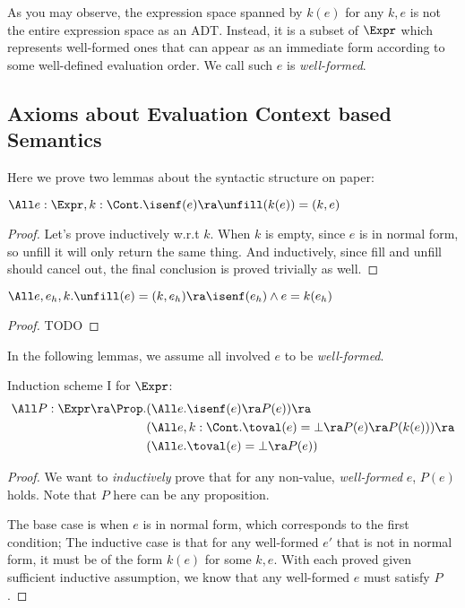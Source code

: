 As you may observe, the expression space spanned by $k(e)$ for any $k, e$ is not the entire
expression space as an ADT. Instead, it is a subset of $\Expr$ which represents well-formed ones
that can appear as an immediate form according to some well-defined evaluation order. We call
such $e$ is \emph{well-formed}.

\subsection{Axioms about Evaluation Context based Semantics}

Here we prove two lemmas about the syntactic structure on paper:

\begin{lemma}
$\All e: \Expr, k: \Cont . \isenf(e) \ra \unfill(k(e)) = (k, e)$
\end{lemma}
\begin{proof}

Let's prove inductively w.r.t $k$. When $k$ is empty,
since $e$ is in normal form, so unfill it will only return the same thing.
And inductively, since fill and unfill should cancel out, the final conclusion is proved trivially as well.

\end{proof}

\begin{lemma}
  $\All e, e_h, k. \unfill(e) = (k, e_h) \ra \isenf(e_h) \land e = k(e_h)$
\end{lemma}
\begin{proof}
  TODO
\end{proof}

In the following lemmas, we assume all involved $e$ to be \emph{well-formed}.

\begin{lemma}
Induction scheme I for $\Expr$:
\begin{align*}
\All P: \Expr \ra \Prop.
  &(\All e. \isenf(e) \ra P(e)) \ra \\
  &(\All e, k: \Cont . \toval(e) = \bot \ra P(e) \ra P(k(e))) \ra\\
  &(\All e. \toval(e) = \bot \ra P(e))
\end{align*}
\end{lemma}
\begin{proof}
We want to \emph{inductively} prove that for any non-value, \emph{well-formed} $e$, $P(e)$ holds.
Note that $P$ here can be any proposition.

The base case is when $e$ is in normal form, which corresponds to the first condition;
The inductive case is that for any well-formed $e'$ that is not in normal form,
it must be of the form $k(e)$ for some $k, e$. With each proved given sufficient inductive
assumption, we know that any well-formed $e$ must satisfy $P$.
\end{proof}

